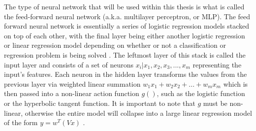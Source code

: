 The type of neural network that will be used within this thesis is
what is called the feed-forward neural network (a.k.a. multilayer perceptron,
or MLP). The feed forward neural network is essentially a series of
logistic regression models stacked on top of each other, with the
final layer being either another logistic regression or linear
regression model depending on whether or not a classification or
regression problem is being solved \cite{Murphy}. The leftmost
layer of this stack is called the input layer and consists of a set of
neurons ${x_i|x_1,x_2,x_3,...,x_m}$ representing the input's
features. Each neuron in the hidden layer transforms the values from
the previous layer via weighted linear summation $w_1x_1 + w_2x_2 +...+w_mx_m$
which is then passed into a non-linear action function $g()$, such as the
logistic function or the hyperbolic tangent function. It is important to note
that $g$ must be non-linear, otherwise the entire model will collapse into a
large linear regression model of the form $y = w^T(Vx)$ \cite{Murphy}.

